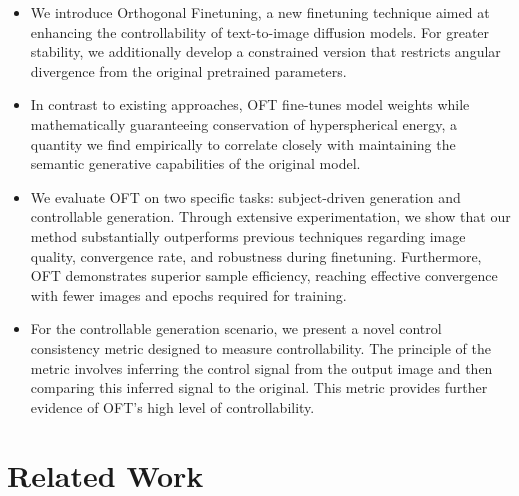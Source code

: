 \begin{itemize}[leftmargin=*,nosep]

    \item We introduce Orthogonal Finetuning, a new finetuning technique aimed at enhancing the controllability of text-to-image diffusion models. For greater stability, we additionally develop a constrained version that restricts angular divergence from the original pretrained parameters.
    \item In contrast to existing approaches, OFT fine-tunes model weights while mathematically guaranteeing conservation of hyperspherical energy, a quantity we find empirically to correlate closely with maintaining the semantic generative capabilities of the original model.
    \item We evaluate OFT on two specific tasks: subject-driven generation and controllable generation. Through extensive experimentation, we show that our method substantially outperforms previous techniques regarding image quality, convergence rate, and robustness during finetuning. Furthermore, OFT demonstrates superior sample efficiency, reaching effective convergence with fewer images and epochs required for training.
    \item For the controllable generation scenario, we present a novel control consistency metric designed to measure controllability. The principle of the metric involves inferring the control signal from the output image and then comparing this inferred signal to the original. This metric provides further evidence of OFT’s high level of controllability.
\end{itemize}

\section{Related Work}

